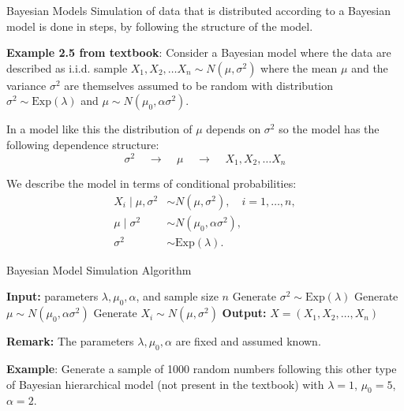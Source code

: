 \documentclass[8pt]{beamer}
\begin{document}
\begin{frame}{Bayesian Models}
Simulation of data that is distributed according to a Bayesian model is done in steps, by following the structure of the model. 

\vspace{3mm}

\textbf{Example 2.5 from textbook}: Consider a Bayesian model where the data are described as i.i.d. sample $X_1, X_2, \ldots X_n \sim N(\mu, \sigma^2)$ where the mean $\mu$ and the variance $\sigma^2$ are themselves assumed to be random with distribution $\sigma^2 \sim \text{Exp}(\lambda)$ and $\mu \sim N(\mu_0, \alpha \sigma^2)$.

In a model like this the distribution of $\mu$ depends on $\sigma^2$ so the model has the following dependence structure:
\begin{equation*}
\sigma^2 \;\;\;\; \longrightarrow \;\;\;\; \mu \;\;\;\; \longrightarrow \;\;\;\; X_1, X_2, \ldots X_n
\end{equation*}

We describe the model in terms of conditional probabilities:
\begin{equation*}
\begin{aligned}
X_i \mid \mu, \sigma^2 &\sim N(\mu, \sigma^2), \quad i=1,\dots,n, \\
\mu \mid \sigma^2 &\sim N(\mu_0, \alpha\sigma^2), \\
\sigma^2 &\sim \text{Exp}(\lambda).
\end{aligned}
\end{equation*}
\end{frame}

\begin{frame}{Bayesian Model Simulation Algorithm}
\begin{algorithm}[H]
\caption{Generate data from the Bayesian model}\label{alg:bayesian-model}
\begin{algorithmic}[1]
  \State \textbf{Input:} parameters $\lambda, \mu_0, \alpha$, and sample size $n$
  \State Generate $\sigma^2 \sim \text{Exp}(\lambda)$
  \State Generate $\mu \sim N(\mu_0, \alpha\sigma^2)$
    \State Generate $X_i \sim N(\mu, \sigma^2)$
  \EndFor
  \State \textbf{Output:} $X = (X_1, X_2, \dots, X_n)$
\end{algorithmic}
\end{algorithm}

\vspace{2mm}

\textbf{Remark:} The parameters $\lambda, \mu_0, \alpha$ are fixed and assumed known.

\vspace{2mm}

\textbf{Example}: Generate a sample of 1000 random numbers following this other type of Bayesian hierarchical model (not present in the textbook) with $\lambda=1$, $\mu_0=5$, $\alpha=2$.
\end{frame}
\end{document}
